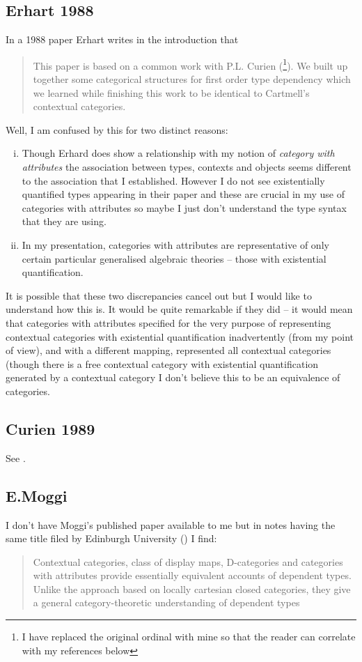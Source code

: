 \documentclass[14pt,a4paper]{scrartcl}
\begin{document}
\subsection{Erhart 1988}
In a 1988 paper Erhart \cite{erhard88} writes in the introduction that
\begin{quote}
This paper is based on a common work with P.L. Curien (\cite{curien89}\footnote{I have replaced the original ordinal with mine so that the reader can correlate with my references below}). We built up together some categorical structures for first order type dependency which we learned while finishing this work to be identical to Cartmell's contextual categories.
\end{quote}
\noindent
Well, I am confused by this for two distinct reasons:
\begin{enumerate} [(i)]
\item Though Erhard does show a relationship with my notion of \textit{category with attributes} 
the association between types, contexts and objects seems different to the association that I 
established. However I do not see existentially quantified types appearing in their paper and these are crucial in my use of categories with attributes so maybe I just don't understand the 
type syntax that they are using.
\item In my presentation, categories with attributes are representative of only certain particular generalised algebraic theories -- those with existential quantification.
\end{enumerate}
It is possible that these two discrepancies cancel out but I would like to understand how this is. It would be quite remarkable if they did -- it would mean that  categories with attributes specified for the very purpose of representing contextual categories with existential quantification inadvertently (from my point of view), and with a different mapping, represented all contextual categories (though there is a free contextual category with existential quantification generated by a contextual category I don't believe this to be an equivalence of categories.


\subsection{Curien 1989}
See \cite{curien89}.

\subsection{E.Moggi} 
I don't have Moggi's published paper \cite{moggi91} available to me but in notes having the same  title filed by Edinburgh University (\cite{moggi94}) I find:
\begin{quote}
Contextual categories, class of display maps, D-categories and categories with
attributes provide essentially equivalent accounts of dependent types. Unlike
the approach based on locally cartesian closed categories, they give a general
category-theoretic understanding of dependent types
\end{quote}
\end{document}
